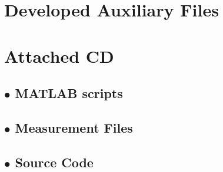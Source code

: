 \begin{appendices}
\chapter{Developed Auxiliary Files}\label{app:auxiliary}


\chapter{Attached CD}\label{app:cd}
\section*{$\bullet$ MATLAB scripts}
\section*{$\bullet$ Measurement Files}
\section*{$\bullet$ Source Code}

\end{appendices}
\label{appendixend}

{}
{}
{}
{}
{}
{}
{}
{}
{}
{}
{}
{}
{}
{}
{}
{}
{}
{}
